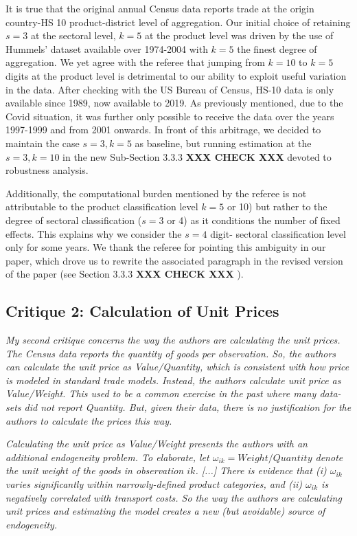\documentclass[a4paper,11pt]{article}
\begin{document}
It is true that the original annual Census data reports trade at the origin country-HS 10 product-district level of aggregation. Our initial choice of retaining $s=3$ at the sectoral level, $k=5$ at the product level was driven by the use of Hummels' dataset available over 1974-2004 with $k=5$ the finest degree of aggregation. We yet agree with the referee that jumping from $k=10$ to $k=5$ digits at the product level is detrimental to our ability to exploit useful variation in the data. After checking with the US Bureau of Census, HS-10 data is only available since 1989, now available to 2019. As previously mentioned, due to the Covid situation, it was further only possible to receive the data over the years 1997-1999 and from 2001 onwards. In front of this arbitrage, we decided to maintain the case $s=3, k=5$ as baseline, but running estimation at the $s=3,k=10$ in the new Sub-Section 3.3.3 \textbf{XXX CHECK XXX }devoted to robustness analysis.

Additionally, the computational burden mentioned by the referee is not attributable to the product classification level $k=5$ or 10) but rather to the degree of sectoral classification ($s=3$ or 4) as it conditions the number of fixed effects. This explains why we consider the $s=4$ digit- sectoral classification level only for some years. We thank the referee for pointing this ambiguity in our paper, which drove us to rewrite the associated paragraph in the revised version of the paper (see Section 3.3.3 \textbf{XXX CHECK XXX }).


\subsection{Critique 2: Calculation of Unit Prices}

\textit{My second critique concerns the way the authors are calculating the unit prices.
The Census data reports the quantity of goods per observation. So, the authors
can calculate the unit price as Value/Quantity, which is consistent with how
price is modeled in standard trade models. Instead, the authors calculate unit
price as Value/Weight. This used to be a common exercise in the past where
many data-sets did not report Quantity. But, given their data, there is no
justification for the authors to calculate the prices this way.}

\textit{Calculating the unit price as Value/Weight presents the authors
with an additional endogeneity problem. To elaborate, let $\omega_{ik} = Weight/Quantity$
denote the unit weight of the goods in observation $ik$. [...] There is evidence that (i) $\omega_{ik}$ varies significantly within narrowly-defined product
categories, and (ii) $\omega_{ik}$ is negatively correlated with transport costs. So the
way the authors are calculating unit prices and estimating the model creates a
new (but avoidable) source of endogeneity.}
\end{document}
